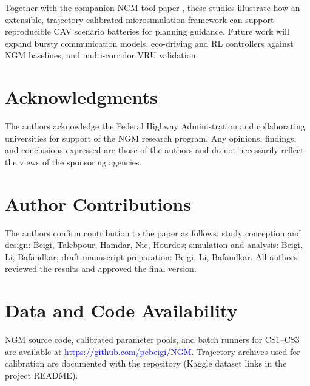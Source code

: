 \documentclass[numbered]{trbunofficial}
\begin{document}
Together with the companion NGM tool paper \cite{BeigiNGMTool2026}, these studies illustrate how
an extensible, trajectory-calibrated microsimulation framework can support reproducible CAV
scenario batteries for planning guidance. Future work will expand bursty communication models,
eco-driving and RL controllers against NGM baselines, and multi-corridor VRU validation.

\section*{Acknowledgments}
The authors acknowledge the Federal Highway Administration and collaborating universities for
support of the NGM research program. Any opinions, findings, and conclusions expressed are
those of the authors and do not necessarily reflect the views of the sponsoring agencies.

\section*{Author Contributions}
The authors confirm contribution to the paper as follows: study conception and design: Beigi,
Talebpour, Hamdar, Nie, Hourdos; simulation and analysis: Beigi, Li, Bafandkar; draft
manuscript preparation: Beigi, Li, Bafandkar. All authors reviewed the results and approved
the final version.

\section*{Data and Code Availability}
NGM source code, calibrated parameter pools, and batch runners for CS1--CS3 are available at
\href{https://github.com/pebeigi/NGM_Test_v1}{\textcolor{blue}{https://github.com/pebeigi/NGM}}.
Trajectory archives used for calibration are documented with the repository (Kaggle dataset
links in the project README).

\newpage


\end{document}
